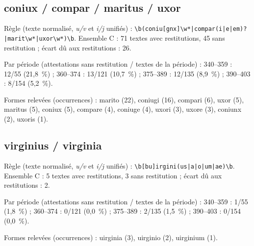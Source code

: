 \subsection*{coniux / compar / maritus / uxor}
\noindent Règle (texte normalisé, \textit{u/v} et \textit{i/j} unifiés) : \texttt{\small \textbackslash{}b(\allowbreak{}coniu[gnx]\textbackslash{}w*|\allowbreak{}compar(\allowbreak{}i|\allowbreak{}e|\allowbreak{}em)?|\allowbreak{}marit\textbackslash{}w*|\allowbreak{}uxor\textbackslash{}w*)\textbackslash{}b}. Ensemble C : 71 textes avec restitutions, 45 sans restitution ; écart dû aux restitutions : 26.\par
\noindent Par période (attestations sans restitution / textes de la période) : 340–359 : 12/55 (21,8~\%) ; 360–374 : 13/121 (10,7~\%) ; 375–389 : 12/135 (8,9~\%) ; 390–403 : 8/154 (5,2~\%).\par
\noindent Formes relevées (occurrences) : marito (22), coniugi (16), compari (6), uxor (5), maritus (5), coniux (5), compare (4), coniuge (4), uxori (3), uxore (3), coniunx (2), uxoris (1).\par
{}\par\medskip
\subsection*{virginius / virginia}
\noindent Règle (texte normalisé, \textit{u/v} et \textit{i/j} unifiés) : \texttt{\small \textbackslash{}b[bu]irgini(\allowbreak{}us|\allowbreak{}a|\allowbreak{}o|\allowbreak{}um|\allowbreak{}ae)\textbackslash{}b}. Ensemble C : 5 textes avec restitutions, 3 sans restitution ; écart dû aux restitutions : 2.\par
\noindent Par période (attestations sans restitution / textes de la période) : 340–359 : 1/55 (1,8~\%) ; 360–374 : 0/121 (0,0~\%) ; 375–389 : 2/135 (1,5~\%) ; 390–403 : 0/154 (0,0~\%).\par
\noindent Formes relevées (occurrences) : uirginia (3), uirginio (2), uirginium (1).\par
{}\par\medskip
